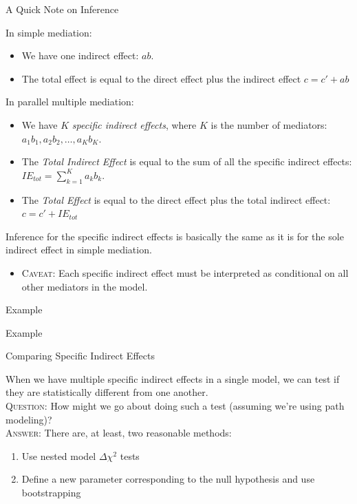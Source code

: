 \documentclass{beamer}
\newcommand{\va}[0]{\vspace{12pt}}
\newcommand{\vb}[0]{\vspace{6pt}}
\newcommand{\vc}[0]{\vspace{3pt}}
\begin{document}
    
\begin{frame}[shrink = 5]{A Quick Note on Inference}
  
  In simple mediation:
  \vb
  \begin{itemize}
    \item We have one indirect effect: $ab$.
      \vc
    \item The total effect is equal to the direct effect plus the
      indirect effect $c = c' + ab$ 
  \end{itemize}
  \va 
  In parallel multiple mediation:
  \vb
  \begin{itemize}
  \item We have $K$ \emph{specific indirect effects}, where $K$ is the
    number of mediators: $a_1b_1, a_2b_2, \ldots, a_Kb_K$.
    \vc
  \item The \emph{Total Indirect Effect} is equal to the sum of all
    the specific indirect effects: $IE_{tot} = \sum_{k = 1}^K a_kb_k$.
    \vc
  \item The \emph{Total Effect} is equal to the direct effect plus the
    total indirect effect: $c = c' + IE_{tot}$
  \end{itemize}
\va 
Inference for the specific indirect effects is basically the same
as it is for the sole indirect effect in simple mediation.
\vb
\begin{itemize}
  \item \textsc{Caveat:} Each specific indirect effect must be
    interpreted as conditional on all other mediators in the model.
\end{itemize}

\end{frame}


\begin{frame}[allowframebreaks]{Example}
  


\end{frame}


\begin{frame}[shrink = 5]{Example}
  


\end{frame}


\begin{frame}{Comparing Specific Indirect Effects}
  
  When we have multiple specific indirect effects in a single model,
  we can test if they are statistically different from one
  another.\\ 
  \va 
  \textsc{Question:} How might we go about doing such a
  test (assuming we're using path modeling)?\\  
  \pause
  \va
  \textsc{Answer:} There are, at least, two reasonable methods:
  \vb
  \begin{enumerate}
    \item Use nested model $\Delta \chi^2$ tests 
      \vc
    \item Define a new parameter corresponding to the null
      hypothesis and use bootstrapping
  \end{enumerate}
  
\end{frame}
\end{document}
